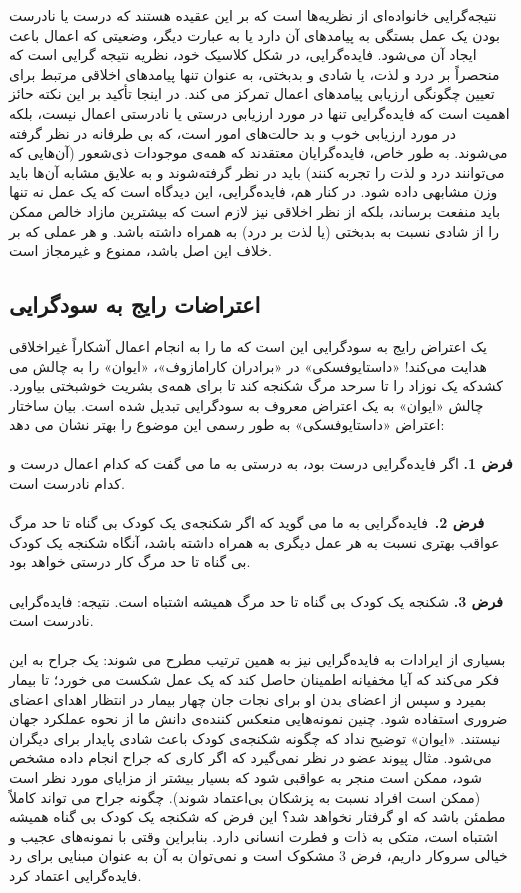 نتیجه‌گرایی خانواده‌ای از نظریه‌ها است که بر این عقیده هستند که درست یا نادرست بودن یک عمل بستگی به پیامدهای آن دارد یا به عبارت دیگر، وضعیتی که اعمال باعث ایجاد آن می‌شود.
فایده‌گرایی، در شکل کلاسیک خود، نظریه نتیجه گرایی است که منحصراً بر درد و لذت، یا شادی و بدبختی، به عنوان تنها پیامدهای اخلاقی مرتبط برای تعیین چگونگی ارزیابی پیامدهای اعمال تمرکز می کند.
در اینجا تأکید بر این نکته حائز اهمیت است که فایده‌گرایی تنها در مورد ارزیابی درستی یا نادرستی اعمال نیست، بلکه در مورد ارزیابی خوب و بد حالت‌های امور است، که بی طرفانه در نظر گرفته می‌شوند.
به طور خاص، فایده‌گرایان معتقدند که همه‌ی موجودات ذی‌شعور (آن‌هایی که می‌توانند درد و لذت را تجربه کنند) باید در نظر گرفته‌شوند و به علایق مشابه آن‌ها باید وزن مشابهی داده شود.
در کنار هم، فایده‌گرایی، این دیدگاه است که یک عمل نه تنها باید منفعت برساند، بلکه از نظر اخلاقی نیز لازم است که بیشترین مازاد خالص ممکن را از شادی نسبت به بدبختی (یا لذت بر درد) به همراه داشته باشد.
و هر عملی که بر خلاف این اصل باشد، ممنوع و غیرمجاز است.

\subsection*{اعتراضات رایج به سودگرایی}
یک اعتراض رایج به سودگرایی این است که ما را به انجام اعمال آشکاراً غیراخلاقی هدایت می‌کند!
«داستایوفسکی» در «برادران کارامازوف»، «ایوان» را به چالش می کشدکه یک نوزاد را تا سرحد مرگ شکنجه کند تا برای همه‌ی بشریت خوشبختی بیاورد.
چالش «ایوان» به یک اعتراض معروف به سودگرایی تبدیل شده است.
بیان ساختار اعتراض «داستایوفسکی» به طور رسمی این موضوع را بهتر نشان می دهد:
\\\\
\textbf{فرض 1.}
اگر فایده‌گرایی درست بود، به درستی به ما می گفت که کدام اعمال درست و کدام نادرست است.
\\\\
\textbf{فرض 2.}\     فایده‌گرایی به ما می گوید که اگر شکنجه‌ی یک کودک بی گناه تا حد مرگ عواقب بهتری نسبت به هر عمل دیگری به همراه داشته باشد، آنگاه شکنجه یک کودک بی گناه تا حد مرگ کار درستی خواهد بود.
\\\\
\textbf{فرض 3.}
شکنجه یک کودک بی گناه تا حد مرگ همیشه اشتباه است.
نتیجه: فایده‌گرایی نادرست است.
\\\\
بسیاری از ایرادات به فایده‌گرایی نیز به همین ترتیب مطرح می شوند: یک جراح به این فکر می‌کند که آیا مخفیانه اطمینان حاصل کند که یک عمل شکست می خورد؛ تا بیمار بمیرد و سپس از اعضای بدن او برای نجات جان چهار بیمار در انتظار اهدای اعضای ضروری استفاده شود.
چنین نمونه‌هایی منعکس کننده‌ی دانش ما از نحوه عملکرد جهان نیستند.
«ایوان» توضیح نداد که چگونه شکنجه‌ی کودک باعث شادی پایدار برای دیگران می‌شود.
مثال پیوند عضو در نظر نمی‌گیرد که اگر کاری که جراح انجام داده مشخص شود، ممکن است منجر به عواقبی شود که بسیار بیشتر از مزایای مورد نظر است (ممکن است افراد نسبت به پزشکان بی‌اعتماد شوند).
چگونه جراح می تواند کاملاً مطمئن باشد که او گرفتار نخواهد شد؟ این فرض که شکنجه یک کودک بی گناه همیشه اشتباه است، متکی به ذات و فطرت انسانی دارد.
بنابراین وقتی با نمونه‌های عجیب و خیالی سروکار داریم، فرض 3 مشکوک است و نمی‌توان به آن به عنوان مبنایی برای رد فایده‌گرایی اعتماد کرد.

